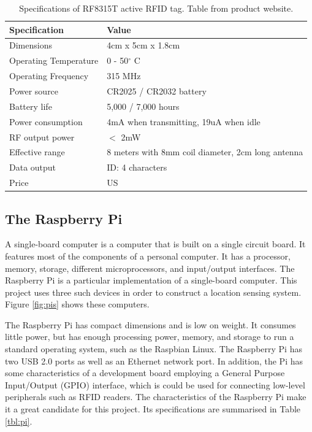 \begin{table}[h]
	\centering
	\begin{tabular}{ | m{4cm} || m{7cm} | }
		\hline
		\textbf{Specification}	& \textbf{Value} \\ \hline
		Dimensions				& 4cm x 5cm x 1.8cm \\ \hline
		Operating Temperature	& 0 - 50$^\circ$ C	\\ \hline
		Operating Frequency		& 315 MHz	\\ \hline
		Power source			& CR2025 / CR2032 battery \\ \hline
		Battery life			& 5,000 / 7,000 hours \\ \hline
		Power consumption		& 4mA when transmitting, 19uA when idle \\ \hline
		RF output power			& $<$ 2mW \\ \hline
		Effective range			& 8 meters with 8mm coil diameter, 2cm long antenna \\ \hline
		Data output				& ID: 4 characters \\ \hline
		Price					& US \textdollar 19.95 \\ \hline
	\end{tabular}
	\caption{Specifications of RF8315T active RFID tag. Table from product website\protect\footnotemark.}
	\label{tbl:tag}
\end{table}


\subsection{The Raspberry Pi}

A single-board computer is a computer that is built on a single circuit board. It features most of the components of a personal computer. It has a processor, memory, storage, different microprocessors, and input/output interfaces. The Raspberry Pi is a particular implementation of a single-board computer. This project uses three such devices in order to construct a location sensing system. Figure \ref{fig:pis} shows these computers.

The Raspberry Pi has compact dimensions and is low on weight. It consumes little power, but has enough processing power, memory, and storage to run a standard operating system, such as the Raspbian Linux. The Raspberry Pi has two USB 2.0 ports as well as an Ethernet network port. In addition, the Pi has some characteristics of a development board employing a General Purpose Input/Output (GPIO) interface, which is could be used for connecting low-level peripherals such as RFID readers. The characteristics of the Raspberry Pi make it a great candidate for this project. Its specifications are summarised in Table \ref{tbl:pi}.


